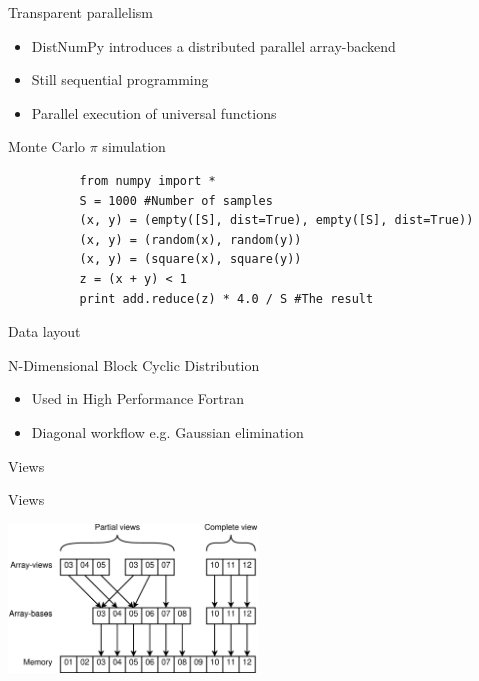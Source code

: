 \documentclass{beamer}
\begin{document}

\begin{frame}[fragile]{Transparent parallelism}
\begin{itemize}
  \item DistNumPy introduces a distributed parallel array-backend
  \item Still sequential programming
  \item Parallel execution of universal functions
\end{itemize}
\vspace{15px}
\begin{center}
\begin{small}
Monte Carlo $\pi$ simulation
\end{small}
\begin{scriptsize}
\begin{verbatim}
          from numpy import *
          S = 1000 #Number of samples
          (x, y) = (empty([S], dist=True), empty([S], dist=True))
          (x, y) = (random(x), random(y))
          (x, y) = (square(x), square(y))
          z = (x + y) < 1
          print add.reduce(z) * 4.0 / S #The result
\end{verbatim}
\end{scriptsize}
\end{center}
\end{frame}


\begin{frame}{Data layout}
\begin{center}
N-Dimensional Block Cyclic Distribution\vspace{15px}

\end{center}
\begin{itemize}
  \item Used in High Performance Fortran
  \item Diagonal workflow e.g. Gaussian elimination
\end{itemize}
\end{frame}


\begin{frame}{Views}
\begin{center}
Views\vspace{15px}

\includegraphics[width=250px]{../gfx/views}
\end{center}
\end{frame}
\end{document}

